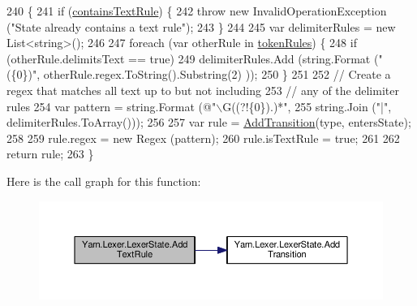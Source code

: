 \begin{DoxyCode}
240             \{
241                 \textcolor{keywordflow}{if} (\hyperlink{a00122_a69948f05c35eeae9cb8448c849a053e6}{containsTextRule}) \{
242                     \textcolor{keywordflow}{throw} \textcolor{keyword}{new} InvalidOperationException (\textcolor{stringliteral}{"State already contains a text rule"});
243                 \}
244 
245                 var delimiterRules = \textcolor{keyword}{new} List<string>();
246 
247                 \textcolor{keywordflow}{foreach} (var otherRule \textcolor{keywordflow}{in} \hyperlink{a00122_adf6563b1dc6f3ef80ed13c2b15b7be03}{tokenRules}) \{
248                     \textcolor{keywordflow}{if} (otherRule.delimitsText == \textcolor{keyword}{true})
249                         delimiterRules.Add (string.Format (\textcolor{stringliteral}{"(\{0\})"}, otherRule.regex.ToString().Substring(2)
      ));
250                 \}
251 
252                 \textcolor{comment}{// Create a regex that matches all text up to but not including}
253                 \textcolor{comment}{// any of the delimiter rules}
254                 var pattern = string.Format (\textcolor{stringliteral}{@"\(\backslash\)G((?!\{0\}).)*"},
255                     string.Join (\textcolor{stringliteral}{"|"}, delimiterRules.ToArray()));
256 
257                 var rule = \hyperlink{a00122_a71ba52744e853ff142de19e97cf5daed}{AddTransition}(type, entersState);
258 
259                 rule.regex = \textcolor{keyword}{new} Regex (pattern);
260                 rule.isTextRule = \textcolor{keyword}{true};
261 
262                 \textcolor{keywordflow}{return} rule;
263             \}
\end{DoxyCode}


Here is the call graph for this function\-:
\nopagebreak
\begin{figure}[H]
\begin{center}
\leavevmode
\includegraphics[width=350pt]{a00122_af183111863c651ae5681665a2c379830_cgraph}
\end{center}
\end{figure}


